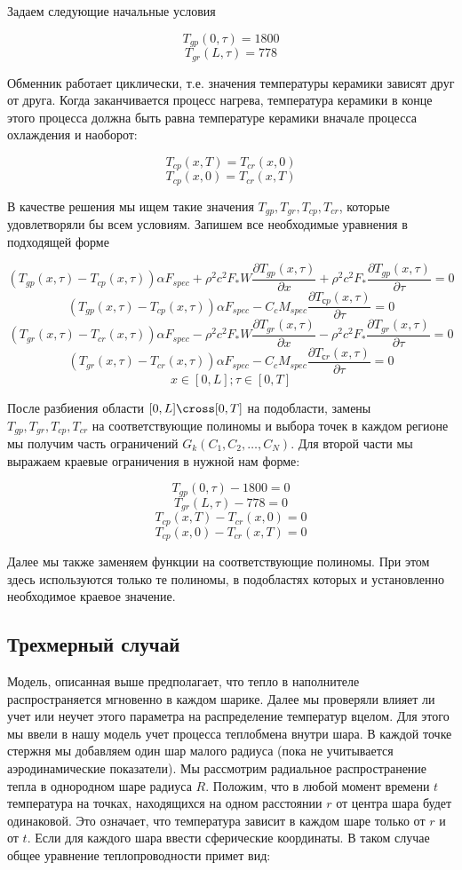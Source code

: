 \documentclass[a4paper,12pt]{article}
\begin{document}
Задаем следующие начальные условия

$$T_{gp}(0,\tau) = 1800$$
$$T_{gr}(L,\tau) = 778$$

Обменник работает циклически, т.е. значения температуры керамики
зависят друг от друга. Когда заканчивается процесс нагрева,
температура керамики в конце этого процесса должна быть равна
температуре керамики вначале процесса охлаждения и наоборот:

$$T_{cp}(x,T) = T_{cr}(x,0)$$
$$T_{cp}(x,0) = T_{cr}(x,T)$$

В качестве решения мы ищем такие значения
$T_{gp}, T_{gr}, T_{cp},T_{cr}$, которые удовлетворяли бы всем условиям.  Запишем все
необходимые уравнения в подходящей форме

$$(T_{gp}(x,\tau) - T_{cp}(x,\tau)) \alpha F_{spec} + \rho^2 c^2 F_* W\frac{\partial T_{gp}(x,\tau)}{\partial x} + \rho^2 c^2 F_*\frac{\partial T_{gp}(x,\tau)}{\partial \tau} = 0$$
$$(T_{gp}(x,\tau) - T_{cp}(x,\tau))\alpha F_{spec} -  C_c M_{spec} \frac{\partial T_{сp}(x,\tau)}{\partial \tau} = 0$$
$$(T_{gr}(x,\tau) - T_{cr}(x,\tau)) \alpha F_{spec} - \rho^2 c^2 F_* W\frac{\partial T_{gr}(x,\tau)}{\partial x} - \rho^2 c^2 F_*\frac{\partial T_{gr}(x,\tau)}{\partial \tau} = 0$$
$$(T_{gr}(x,\tau) - T_{cr}(x,\tau))\alpha F_{spec} -  C_c M_{spec} \frac{\partial T_{сr}(x,\tau)}{\partial \tau} = 0$$
$$x \in [0, L]; \tau \in [0, T]$$

После разбиения области $[0,L] \cross [0,T]$ на подобласти,
замены $T_{gp}, T_{gr}, T_{cp}, T_{cr}$ на соответствующие полиномы
и выбора точек в каждом регионе мы получим часть
ограничений $G_k(C_1,C_2,\ldots,C_N)$. Для второй части мы выражаем
краевые ограничения в нужной нам форме:

$$T_{gp}(0,\tau) - 1800 = 0$$
$$T_{gr}(L,\tau) - 778 = 0$$
$$T_{cp}(x,T) - T_{cr}(x,0) = 0$$
$$T_{cp}(x,0) - T_{cr}(x,T) = 0$$

Далее мы также заменяем функции на соответствующие полиномы. При этом
здесь используются только те полиномы, в подобластях которых и
установленно необходимое краевое значение.

\subsection{Трехмерный случай}

Модель, описанная выше предполагает, что тепло в наполнителе
распространяется мгновенно в каждом шарике. Далее мы проверяли влияет
ли учет или неучет этого параметра на распределение температур вцелом.
Для этого мы ввели в нашу модель учет процесса теплобмена внутри
шара. В каждой точке стержня мы добавляем один шар малого радиуса
(пока не учитывается аэродинамические показатели).  Мы рассмотрим
радиальное распространение тепла в однородном шаре
радиуса $R$. Положим, что в любой момент времени $t$ температура
на точках, находящихся на одном расстоянии $r$ от центра шара будет
одинаковой. Это означает, что температура зависит в каждом шаре только
от $r$ и от $t$. Если для каждого шара ввести сферические
координаты. В таком случае общее уравнение теплопроводности примет
вид:
\end{document}
